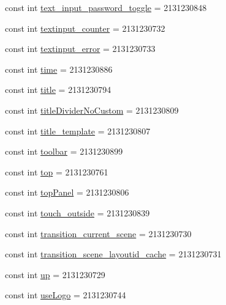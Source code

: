 \begin{CompactItemize}
\item 
const int \hyperlink{class__2doo_1_1_droid_1_1_resource_1_1_id_990b73815c0c8a70e2dd5041dc791627}{text\_\-input\_\-password\_\-toggle} = 2131230848
\item 
const int \hyperlink{class__2doo_1_1_droid_1_1_resource_1_1_id_346ae0e243191714bc04ed7d88a1d56b}{textinput\_\-counter} = 2131230732
\item 
const int \hyperlink{class__2doo_1_1_droid_1_1_resource_1_1_id_57df9c69237456246a563c1d8da68676}{textinput\_\-error} = 2131230733
\item 
const int \hyperlink{class__2doo_1_1_droid_1_1_resource_1_1_id_1ca15b4ef5a532f07661a1f71ea06cff}{time} = 2131230886
\item 
const int \hyperlink{class__2doo_1_1_droid_1_1_resource_1_1_id_7fb7e11ddfa255ca02b48c0c1ac319cb}{title} = 2131230794
\item 
const int \hyperlink{class__2doo_1_1_droid_1_1_resource_1_1_id_763b64b8b23aa10394c5a8ad5e42cc94}{titleDividerNoCustom} = 2131230809
\item 
const int \hyperlink{class__2doo_1_1_droid_1_1_resource_1_1_id_f607fc8bf92ed1c22e3d3aa8aad0a61a}{title\_\-template} = 2131230807
\item 
const int \hyperlink{class__2doo_1_1_droid_1_1_resource_1_1_id_9546bd8a7d2dd6efb918e89fa21b5f0a}{toolbar} = 2131230899
\item 
const int \hyperlink{class__2doo_1_1_droid_1_1_resource_1_1_id_0788283893dd4e5ef5c4938c197a7230}{top} = 2131230761
\item 
const int \hyperlink{class__2doo_1_1_droid_1_1_resource_1_1_id_f12045134432943c3e1fff0a5426a0be}{topPanel} = 2131230806
\item 
const int \hyperlink{class__2doo_1_1_droid_1_1_resource_1_1_id_b6063d316b0986f72969a06b3c86d96a}{touch\_\-outside} = 2131230839
\item 
const int \hyperlink{class__2doo_1_1_droid_1_1_resource_1_1_id_a61dd7c41cb201881ab77205d3c863ec}{transition\_\-current\_\-scene} = 2131230730
\item 
const int \hyperlink{class__2doo_1_1_droid_1_1_resource_1_1_id_c5b8be6fd52b26dbd08c84b67f38a7ab}{transition\_\-scene\_\-layoutid\_\-cache} = 2131230731
\item 
const int \hyperlink{class__2doo_1_1_droid_1_1_resource_1_1_id_cc11caa3a16901acf2152c657d1876c7}{up} = 2131230729
\item 
const int \hyperlink{class__2doo_1_1_droid_1_1_resource_1_1_id_d27d3b3dc9896fc719f059541c85796d}{useLogo} = 2131230744

\end{CompactItemize}
